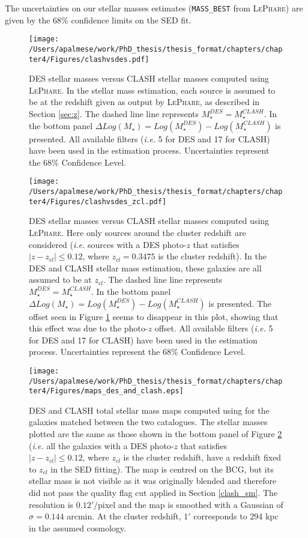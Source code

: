 {The uncertainties on our stellar masses estimates (\texttt{MASS\_BEST} from \textsc{LePhare}) are given by the 68\% confidence limits on the SED fit.
\begin{figure}\centering
\texttt{[image: /Users/apalmese/work/PhD\_thesis/thesis\_format/chapters/chapter4/Figures/clashvsdes.pdf]}
\caption{DES stellar masses versus CLASH stellar masses computed using \textsc{LePhare}. In the stellar mass estimation, each source is  assumed to be at the redshift given as output by \textsc{LePhare}, as described in Section \ref{sec:z}. The dashed line line represents $M_\star^{DES}=M_\star^{CLASH}$. In the bottom panel $\Delta Log(M_\star)=Log(M_\star^{DES})-Log(M_\star^{CLASH})$ is presented. All available filters (\emph{i.e.} 5 for DES and 17 for CLASH) have been used in the estimation process. Uncertainties represent the 68\% Confidence Level.}\label{SMdesvsclash}
\end{figure}
\begin{figure}\centering
\texttt{[image: /Users/apalmese/work/PhD\_thesis/thesis\_format/chapters/chapter4/Figures/clashvsdes\_zcl.pdf]}
\caption{DES stellar masses versus CLASH stellar masses computed using \textsc{LePhare}. Here only sources around the cluster redshift are considered (\emph{i.e.} sources with a DES photo-$z$ that satisfies $|z-z_{cl}| \le 0.12$, where $z_{cl}=0.3475$ is the cluster redshift). In the DES and CLASH stellar mass estimation, these galaxies are all assumed to be at $z_{cl}$. The dashed line line represents $M_\star^{DES}=M_\star^{CLASH}$. In the bottom panel $\Delta Log(M_\star)=Log(M_\star^{DES})-Log(M_\star^{CLASH})$ is presented. The offset seen in Figure \ref{SMdesvsclash} seems to disappear in this plot, showing that this effect was due to the photo-$z$ offset. All available filters (\emph{i.e.} 5 for DES and 17 for CLASH) have been used in the estimation process. Uncertainties represent the 68\% Confidence Level.}\label{SMdesvsclash_zcl}
\end{figure}
\begin{figure}\centering
\texttt{[image: /Users/apalmese/work/PhD\_thesis/thesis\_format/chapters/chapter4/Figures/maps\_des\_and\_clash.eps]}\caption{DES and CLASH total stellar mass maps computed using \lephare for the galaxies matched between the two catalogues. The stellar masses plotted are the same as those shown in the bottom panel of Figure \protect\ref{SMdesvsclash_zcl} (\emph{i.e.} all the galaxies with a DES photo-$z$ that satisfies $|z-z_{cl}| \le 0.12$, where $z_{cl}$ is the cluster redshift, have a redshift fixed to $z_{cl}$ in the SED fitting). The map is centred on the BCG, but its stellar mass is not visible as it was originally blended and therefore did not pass the quality flag cut applied in Section \ref{clash_sm}. The resolution is $0.12'/$pixel and the map is smoothed with a Gaussian of $\sigma=0.144$ arcmin. At the cluster redshift, $1'$ corresponds to 294 kpc in the assumed cosmology.}\label{desclashmaps}
\end{figure}

}
